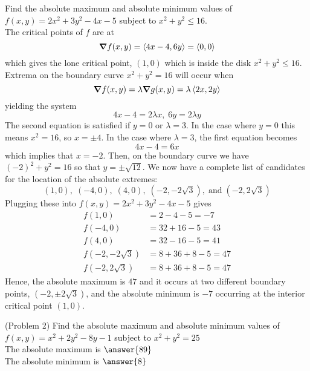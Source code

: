 \documentclass[handout]{ximera}
\begin{document}
\begin{example}[Example 2]
Find the absolute maximum and absolute minimum values of $f(x,y) = 2x^2 + 3y^2 - 4x - 5$ subject to $x^2 + y^2 \leq 16$.\\
The critical points of $f$ are at
\[
\boldsymbol\nabla f(x,y) = \left\langle 4x -4, 6y\right\rangle = \left\langle 0,0\right\rangle
\]
 which gives the lone critical point, $(1,0)$ which is inside the disk $x^2 + y^2 \leq 16$.\\
 Extrema on the boundary curve $x^2 + y^2 = 16$ will occur when
 \[
 \boldsymbol\nabla f(x,y) = \lambda \boldsymbol\nabla g(x,y) = \lambda \left\langle 2x, 2y\right\rangle
 \]
 yielding the system
 \[
 4x - 4 = 2\lambda x, \; 6y = 2\lambda y
 \]
 The second equation is satisfied if $y = 0$ or $\lambda = 3$.  In the case where $y = 0$ this means $x^2 = 16$, so $x = \pm 4$.
 In the case where $\lambda = 3$, the first equation becomes
 \[
 4x - 4 = 6x 
 \]
 which implies that $x = -2$.  Then, on the boundary curve we have $(-2)^2 + y^2 = 16$ so that $y = \pm \sqrt{12}$.
 We now have a complete list of candidates for the location of the absolute extremes:
 \[
 (1,0), \; (-4, 0), \; (4,0), \; (-2, -2\sqrt3), \;\text{and} \; (-2, 2\sqrt 3)
 \]
 Plugging these into $f(x,y) = 2x^2 + 3y^2 - 4x - 5$ gives
 \begin{align*}
 f(1,0) &= 2-4-5=-7\\
 f(-4, 0) &= 32 +16 -5 = 43\\
 f(4, 0) &= 32 -16 -5 = 41\\
 f(-2, -2\sqrt3) &= 8 + 36 +8-5 = 47\\
 f(-2, 2\sqrt3) &= 8 + 36 +8-5 = 47
 \end{align*}
 Hence, the absolute maximum is $47$ and it occurs at two different boundary points, $(-2, \pm 2\sqrt 3)$,
 and the absolute minimum is $-7$ occurring at the interior critical point $(1,0)$.
 
 
\end{example}

\begin{problem}(Problem 2)
Find the absolute maximum and absolute minimum values of $f(x,y) = x^2 + 2y^2 - 8y - 1$ subject to $x^2 + y^2 = 25$\\
The absolute maximum is $\answer{89}$\\
The absolute minimum is $\answer{8}$
\end{problem}
\end{document}
